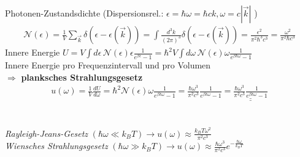 




{\Huge
Photonen-Zustandsdichte (Dispersionsrel.: \(\epsilon = \hbar \omega = \hbar c k, \omega = c |\vec k|\) )
\begin{align*}
\mathcal N (\epsilon) = \frac{1}{V}\sum_{\vec k} \delta(\epsilon - \epsilon(\vec k)) = \int \frac{d^3k}{(2\pi)^3} \delta(\epsilon - \epsilon(\vec k))= \frac{ \epsilon^2}{\pi^2 \hbar^3 c^3} =\frac{ \omega^2}{\pi^2 \hbar c^3} 
\end{align*}
Innere Energie \(
  U = V\int d\epsilon\,\mathcal N(\epsilon) \epsilon \frac{1}{e^{\beta \epsilon}-1} =\hbar^2 V\int d\omega\,\mathcal N(\epsilon) \omega \frac{1}{e^{\beta \hbar\omega}-1}
\)\\
Innere Energie pro Frequenzintervall und pro Volumen\\
 \(\Rightarrow \) \textbf{planksches Strahlungsgesetz}
\begin{align*}
  u(\omega) = \frac{1}{V}\frac{dU}{d\omega} =  \hbar^2 \mathcal N(\epsilon) \omega \frac{1}{e^{\beta \hbar\omega}-1} = \frac{\hbar  \omega^3}{\pi^2  c^3} \frac{1}{e^{\beta \hbar\omega}-1} = \underline{\underline{\frac{\hbar  \omega^3}{\pi^2  c^3} \frac{1}{e^{\beta \hbar\omega}-1}}}
\end{align*}\\\\
\textit{Rayleigh-Jeans-Gesetz} \((\hbar\omega\ll k_B T) \rightarrow u(\omega) \approx \frac{k_B T \omega^2}{\pi^2  c^3} \) \\
\textit{Wiensches Strahlungsgesetz} \((\hbar\omega \gg k_B T) \rightarrow u(\omega) \approx  \frac{\hbar  \omega^3}{\pi^2  c^3} e^{-\frac{\hbar\omega}{k_B T}} \) 
}%

